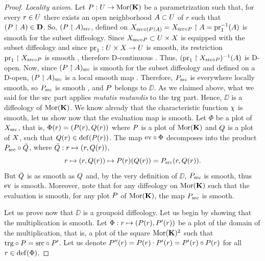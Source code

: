 \begin{proof}
  {\em Locality axiom.}
  Let $\P : \U \to \Mor(\KK)$ be a parametrization such that,
  for every $r \in \U$ there exists an open neighborhood $\A \subset \U$ of $r$ such that $(\P \restriction \A) \in \DD$.
  So,
  $(\P \restriction \A)_\source$,
  defined on $\X_{\source \circ (\P \restriction \A)} = \X_{\source \circ \P} \restriction \A = \pr_1^{-1}(\A)$ is smooth for the subset diffeology.
  Since $\X_{\source \circ \P} \subset \U \times \X$ is equipped with the subset diffeology and since $\pr_1 : \U \times \X \to \U$ is smooth,
  its restriction $\pr_1 \restriction \X_{\source \circ \P}$ is smooth
  ,
  therefore D-continuous  .
  Thus,
  $(\pr_1 \restriction \X_{\source \circ \P})^{-1}(\A)$ is D-open.
  Now,
  since $(\P \restriction \A)_\source$ is smooth for the subset diffeology and defined on a D-open,
  $(\P \restriction \A)_\source$
  is a local smooth map .
  Therefore,
  $\P_\source$ is everywhere locally smooth,
  so $\P_\source$ is smooth ,
  and $\P$ belongs to $\DD$.
  As we claimed above,
  what we said for the $\source$ part applies {\em mutatis mutandis\/} to the $\target$ part.
  Hence, $\DD$ is a diffeology of $\Mor(\KK)$.
  We know already that the characteristic function $\car$ is smooth,
  let us show now that the evaluation map is smooth.
  Let $\Phi$ be a plot of $\X_\source$,
  that is,
  $\Phi(r) = (\P(r), \Q(r))$ where $\P$ is a plot of $\Mor(\KK)$ and $\Q$ is a plot of $\X$,
  such that $\Q(r) \in \Def(\P(r))$.
  The map $\ev \circ \Phi$ decomposes into the product $\P_\source \circ \bar\Q$,
  where $\bar\Q : r \mapsto (r, \Q(r))$,
  $$%
  r \mapsto (r,\Q(r)) \mapsto \P(r)(\Q(r)) = \P_\source(r,\Q(r)).
  $$%
  But $\bar\Q$ is as smooth as $\Q$ and,
  by the very definition of $\DD$,
  $\P_\source$ is smooth,
  thus $\ev$ is smooth.
  Moreover,
  note that for any diffeology on $\Mor(\KK)$ such that the evaluation is smooth,
  for any plot $\P$ of  $\Mor(\KK)$,
  the map $\P_\source$ is smooth.
  
  Let us prove now that $\DD$ is a groupoid diffeology.
  Let us begin by showing that the multiplication is smooth.
  Let $\Phi : r \mapsto (\P(r), \P'(r))$ be a plot of the domain of the multiplication,
  that is,
  a plot of the square $\Mor(\KK)^2$ such that $\target \circ \P = \source \circ \P'$.
  Let us denote $\P''(r) = \P(r) \cdot \P'(r) = \P'(r) \circ \P(r)$ for all $r \in \Dom(\Phi)$.
  

\end{proof}
